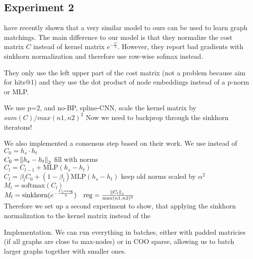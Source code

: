 \subsection{Experiment 2}

\cite{fey2020_update} have recently shown that a very similar model to ours can be used to learn graph matchings. The main difference to our model is that they normalize the cost matrix $C$ instead of kernel matrix $e^{-\frac{C}{\lambda}}$. However, they report bad gradients with sinkhorn normalization and therefore use row-wise sofmax instead.


They only use the left upper part of the cost matrix (not a problem because aim for hits@1)
and they use the dot product of node embeddings instead of a p-norm or MLP.

We use p=2, and no-BP, spline-CNN, scale the kernel matrix by $sum(C) / max(n1,n2)^2$
Now we need to backprop through the sinkhorn iteratons!

We also implemented a consensus step based on their work. We use instead of
\\
$C_0 = h_s \cdot h_t$\\
$C_0 = \norm{h_s - h_t}_2$ fill with norms\\
$C_l = C_{l - 1} + \text{MLP}(h_s - h_t)$\\
$C_l = \beta_l C_0 + (1 - \beta_l) \text{MLP}(h_s - h_t)$ keep old norms scaled by $\alpha^2$\\
$M_l = \text{softmax}(C_l)$ \\
$M_l = \text{sinkhorn}(e^{-\frac{C_l * \text{reg}}{\lambda}}) \quad \text{reg} = \frac{\norm{C_l}_1}{\max(n1,n2)^2}$\\


Therefore we set up a second experiment to show, that applying the sinkhorn normalization to the kernel matrix instead of the



Implementation. We can run everything in batches, either with padded matricies (if all graphs are close to max-nodes) or in COO sparse, allowing us to batch larger graphs together with smaller ones.
